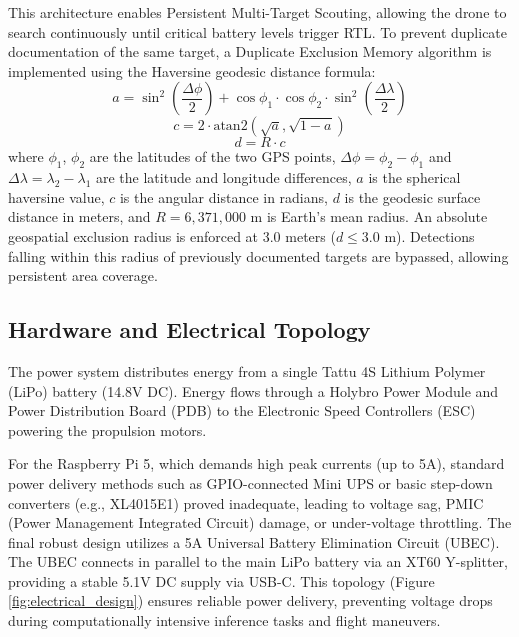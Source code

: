 \documentclass[conference]{IEEEtran}
\begin{document}
This architecture enables Persistent Multi-Target Scouting, allowing the drone to search continuously until critical battery levels trigger RTL. To prevent duplicate documentation of the same target, a Duplicate Exclusion Memory algorithm is implemented using the Haversine geodesic distance formula:
\begin{equation}
a = \sin^2\left(\frac{\Delta\phi}{2}\right) + \cos\phi_1 \cdot \cos\phi_2 \cdot \sin^2\left(\frac{\Delta\lambda}{2}\right)
\end{equation}
\begin{equation}
c = 2 \cdot \text{atan2}\left(\sqrt{a}, \sqrt{1-a}\right)
\end{equation}
\begin{equation}
d = R \cdot c
\end{equation}
where $\phi_1$, $\phi_2$ are the latitudes of the two GPS points, $\Delta\phi = \phi_2 - \phi_1$ and $\Delta\lambda = \lambda_2 - \lambda_1$ are the latitude and longitude differences, $a$ is the spherical haversine value, $c$ is the angular distance in radians, $d$ is the geodesic surface distance in meters, and $R = 6,371,000$ m is Earth's mean radius. An absolute geospatial exclusion radius is enforced at 3.0 meters ($d \leq 3.0$ m). Detections falling within this radius of previously documented targets are bypassed, allowing persistent area coverage.

\subsection{Hardware and Electrical Topology}
The power system distributes energy from a single Tattu 4S Lithium Polymer (LiPo) battery (14.8V DC). Energy flows through a Holybro Power Module and Power Distribution Board (PDB) to the Electronic Speed Controllers (ESC) powering the propulsion motors.

For the Raspberry Pi 5, which demands high peak currents (up to 5A), standard power delivery methods such as GPIO-connected Mini UPS or basic step-down converters (e.g., XL4015E1) proved inadequate, leading to voltage sag, PMIC (Power Management Integrated Circuit) damage, or under-voltage throttling. The final robust design utilizes a 5A Universal Battery Elimination Circuit (UBEC). The UBEC connects in parallel to the main LiPo battery via an XT60 Y-splitter, providing a stable 5.1V DC supply via USB-C. This topology (Figure \ref{fig:electrical_design}) ensures reliable power delivery, preventing voltage drops during computationally intensive inference tasks and flight maneuvers.
\end{document}
